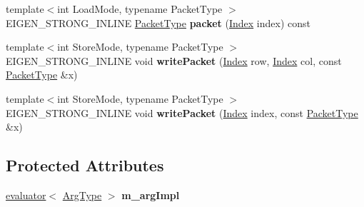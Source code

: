 \begin{DoxyCompactItemize}
\item 
\mbox{\label{struct_eigen_1_1internal_1_1evaluator__wrapper__base_a1d5c0ece1d9beb02a6e3cf3cbff39220}} 
{\footnotesize template$<$int Load\+Mode, typename Packet\+Type $>$ }\\E\+I\+G\+E\+N\+\_\+\+S\+T\+R\+O\+N\+G\+\_\+\+I\+N\+L\+I\+NE \hyperlink{struct_eigen_1_1_packet_type}{Packet\+Type} {\bfseries packet} (\hyperlink{namespace_eigen_a62e77e0933482dafde8fe197d9a2cfde}{Index} index) const
\item 
\mbox{\label{struct_eigen_1_1internal_1_1evaluator__wrapper__base_a05c007daf5b8cc64e2c962c6ddb1b9be}} 
{\footnotesize template$<$int Store\+Mode, typename Packet\+Type $>$ }\\E\+I\+G\+E\+N\+\_\+\+S\+T\+R\+O\+N\+G\+\_\+\+I\+N\+L\+I\+NE void {\bfseries write\+Packet} (\hyperlink{namespace_eigen_a62e77e0933482dafde8fe197d9a2cfde}{Index} row, \hyperlink{namespace_eigen_a62e77e0933482dafde8fe197d9a2cfde}{Index} col, const \hyperlink{struct_eigen_1_1_packet_type}{Packet\+Type} \&x)
\item 
\mbox{\label{struct_eigen_1_1internal_1_1evaluator__wrapper__base_a1adee3ca0efc3280603884dda77bd012}} 
{\footnotesize template$<$int Store\+Mode, typename Packet\+Type $>$ }\\E\+I\+G\+E\+N\+\_\+\+S\+T\+R\+O\+N\+G\+\_\+\+I\+N\+L\+I\+NE void {\bfseries write\+Packet} (\hyperlink{namespace_eigen_a62e77e0933482dafde8fe197d9a2cfde}{Index} index, const \hyperlink{struct_eigen_1_1_packet_type}{Packet\+Type} \&x)
\end{DoxyCompactItemize}
\subsection*{Protected Attributes}
\begin{DoxyCompactItemize}
\item 
\mbox{\label{struct_eigen_1_1internal_1_1evaluator__wrapper__base_a3978aea98e0422d98796086b4d30d1e4}} 
\hyperlink{struct_eigen_1_1internal_1_1evaluator}{evaluator}$<$ \hyperlink{group___sparse_core___module}{Arg\+Type} $>$ {\bfseries m\+\_\+arg\+Impl}
\end{DoxyCompactItemize}


